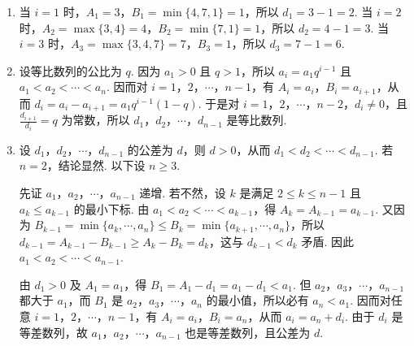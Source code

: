 \begin{solution}
\begin{enumerate}
\item 当 \(i=1\) 时，\(A_1=3\)，\(B_1=\min\{4,7,1\}=1\)，所以 \(d_1=3-1=2\). 当 \(i=2\) 时，\(A_2=\max\{3,4\}=4\)，\(B_2=\min\{7,1\}=1\)，所以 \(d_2=4-1=3\). 当 \(i=3\) 时，\(A_3=\max\{3,4,7\}=7\)，\(B_3=1\)，所以 \(d_3=7-1=6\).
\item 设等比数列的公比为 \(q\). 因为 \(a_1>0\) 且 \(q>1\)，所以 \(a_i=a_1q^{i-1}\) 且 \(a_1<a_2<\cdots<a_n\). 因而对 \(i=1\)，\(2\)，\(\cdots\)，\(n-1\)，有 \(A_i=a_i\)，\(B_i=a_{i+1}\)，从而 \(d_i=a_i-a_{i+1}=a_1q^{i-1}(1-q)\). 于是对 \(i=1\)，\(2\)，\(\cdots\)，\(n-2\)，\(d_i\neq0\)，且 \(\frac{d_{i+1}}{d_i}=q\) 为常数，所以 \(d_1\)，\(d_2\)，\(\cdots\)，\(d_{n-1}\) 是等比数列.
\item 设 \(d_1\)，\(d_2\)，\(\cdots\)，\(d_{n-1}\) 的公差为 \(d\)，则 \(d>0\)，从而 \(d_1<d_2<\cdots<d_{n-1}\). 若 \(n=2\)，结论显然. 以下设 \(n\geqslant3\).

先证 \(a_1\)，\(a_2\)，\(\cdots\)，\(a_{n-1}\) 递增. 若不然，设 \(k\) 是满足 \(2\leqslant k\leqslant n-1\) 且 \(a_k\leqslant a_{k-1}\) 的最小下标. 由 \(a_1<a_2<\cdots<a_{k-1}\)，得 \(A_k=A_{k-1}=a_{k-1}\). 又因为 \(B_{k-1}=\min\{a_k,\cdots,a_n\}\leqslant B_k=\min\{a_{k+1},\cdots,a_n\}\)，所以 \(d_{k-1}=A_{k-1}-B_{k-1}\geqslant A_k-B_k=d_k\)，这与 \(d_{k-1}<d_k\) 矛盾. 因此 \(a_1<a_2<\cdots<a_{n-1}\).

由 \(d_1>0\) 及 \(A_1=a_1\)，得 \(B_1=A_1-d_1=a_1-d_1<a_1\). 但 \(a_2\)，\(a_3\)，\(\cdots\)，\(a_{n-1}\) 都大于 \(a_1\)，而 \(B_1\) 是 \(a_2\)，\(a_3\)，\(\cdots\)，\(a_n\) 的最小值，所以必有 \(a_n<a_1\). 因而对任意 \(i=1\)，\(2\)，\(\cdots\)，\(n-1\)，有 \(A_i=a_i\)，\(B_i=a_n\)，从而 \(a_i=a_n+d_i\). 由于 \(d_i\) 是等差数列，故 \(a_1\)，\(a_2\)，\(\cdots\)，\(a_{n-1}\) 也是等差数列，且公差为 \(d\).
\end{enumerate}
\end{solution}
